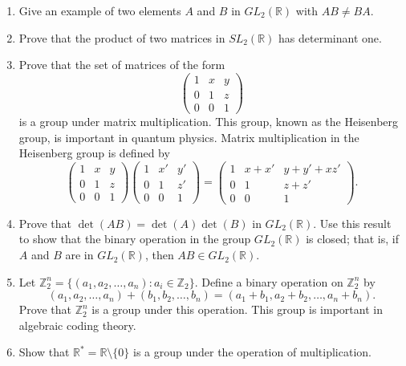 {\begin{enumerate}
 
\item
Give an example of two elements $A$ and $B$ in $GL_2({\mathbb R})$ with
$AB \neq BA$.
 
 
\item
Prove that the product of two matrices in $SL_2({\mathbb R})$ has
determinant one.
 
 
\item
Prove that the set of matrices of the form
\[
\begin{pmatrix}
1 & x & y \\
0 & 1 & z \\
0 & 0 & 1
\end{pmatrix}
\]
is a group under matrix multiplication.  This group, known as the
{\bfi Heisenberg group}, is important in
quantum physics.  Matrix multiplication in the Heisenberg group is
defined by  
\[
\begin{pmatrix}
1 & x & y \\
0 & 1 & z \\
0 & 0 & 1
\end{pmatrix}
\begin{pmatrix}
1 & x' & y' \\
0 & 1 & z' \\
0 & 0 & 1
\end{pmatrix}
=
\begin{pmatrix}
1 & x+x' & y+y'+xz' \\
0 & 1 & z+z' \\
0 & 0 & 1
\end{pmatrix}.
\]
 
 
\item %
Prove that $\det(AB) = \det(A) \det(B)$ in $GL_2({\mathbb R})$. Use this
result to show that the binary operation in the group $GL_2({\mathbb R})$
is closed; that is, if $A$ and $B$ are in $GL_2({\mathbb R})$, then $AB
\in GL_2({\mathbb R})$.
 
 
\item %
Let ${\mathbb Z}_2^n = \{ (a_1, a_2, \ldots, a_n) : a_i \in {\mathbb Z}_2
\}$. Define a binary operation on ${\mathbb Z}_2^n$ by
\[
(a_1, a_2, \ldots, a_n)
+
(b_1, b_2, \ldots, b_n)
=
(a_1+b_1, a_2+b_2, \ldots, a_n+b_n).
\]
Prove that ${\mathbb Z}_2^n$ is a group under this operation. This group
is important in algebraic coding theory. 
 
 
\item
Show that ${\mathbb R}^{\ast} = {\mathbb R} \setminus \{0 \}$ is a group
under the operation of multiplication. 
 

\end{enumerate}}

